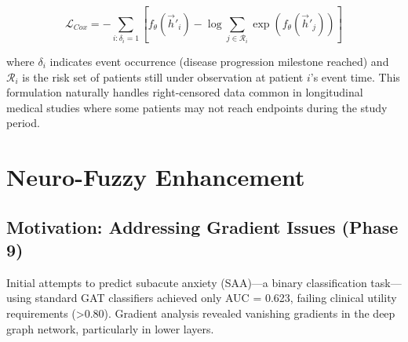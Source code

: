 \documentclass[conference]{IEEEtran}
\begin{document}
\begin{equation}
\mathcal{L}_{Cox} = -\sum_{i: \delta_i=1} \left[f_\theta(\vec{h}'_i) - \log\sum_{j \in \mathcal{R}_i} \exp(f_\theta(\vec{h}'_j))\right]
\end{equation}

where $\delta_i$ indicates event occurrence (disease progression milestone reached) and $\mathcal{R}_i$ is the risk set of patients still under observation at patient $i$'s event time. This formulation naturally handles right-censored data common in longitudinal medical studies where some patients may not reach endpoints during the study period.



\section{Neuro-Fuzzy Enhancement}
\label{sec:neurofuzzy}

\subsection{Motivation: Addressing Gradient Issues (Phase 9)}

Initial attempts to predict subacute anxiety (SAA)---a binary classification task---using standard GAT classifiers achieved only AUC = 0.623, failing clinical utility requirements (>0.80). Gradient analysis revealed vanishing gradients in the deep graph network, particularly in lower layers.
\end{document}

